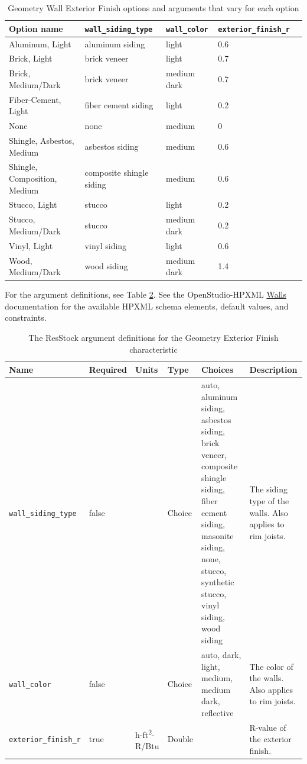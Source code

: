\begin{longtable}[]{|p{3.5cm}|p{2.5cm}|p{}|p{2.5cm}|p{2.5cm}|} \caption{Geometry Wall Exterior Finish options and arguments that vary for each option} \label{table:hc_opt_geo_wall_ext_fin} \\  

\toprule\noalign{}
Option name & \texttt{wall\_siding\_type} &
\texttt{wall\_color} & \texttt{exterior\_finish\_r} \\
\midrule\noalign{}
\endhead
\bottomrule\noalign{}
\endlastfoot
Aluminum, Light & aluminum siding & light & 0.6 \\ \hline
Brick, Light & brick veneer & light & 0.7 \\\hline
Brick, Medium/Dark & brick veneer & medium dark & 0.7 \\\hline
Fiber-Cement, Light & fiber cement siding & light & 0.2 \\\hline
None & none & medium & 0 \\\hline
Shingle, Asbestos, Medium & asbestos siding & medium & 0.6 \\\hline
Shingle, Composition, Medium & composite shingle siding & medium
& 0.6 \\\hline
Stucco, Light & stucco & light & 0.2 \\\hline
Stucco, Medium/Dark & stucco & medium dark & 0.2 \\\hline
Vinyl, Light & vinyl siding & light & 0.6 \\\hline
Wood, Medium/Dark & wood siding & medium dark & 1.4 \\
\end{longtable}

For the argument definitions, see Table \ref{table:hc_arg_def_ext_finish}. See the OpenStudio-HPXML \href{https://openstudio-hpxml.readthedocs.io/en/v1.8.1/workflow_inputs.html#hpxml-walls}{Walls} documentation for the available HPXML schema elements, default values, and constraints.

\begin{longtable}[]{|p{3.5cm}|p{1.5cm}|p{1.3cm}|p{1.1cm}|p{}|p{3.3cm}|}
\caption{The ResStock argument definitions for the Geometry Exterior Finish characteristic} \label{table:hc_arg_def_ext_finish} \\
\toprule\noalign{}
Name & Required & Units & Type & Choices & Description \\
\midrule\noalign{}
\endhead
\bottomrule\noalign{}
\endlastfoot
\texttt{wall\_siding\_type} & false & & Choice & auto, aluminum siding,
asbestos siding, brick veneer, composite shingle siding, fiber cement
siding, masonite siding, none, stucco, synthetic stucco, vinyl siding,
wood siding & The siding type of the walls. Also applies to rim joists. \\
\hline
\texttt{wall\_color} & false & & Choice & auto, dark, light, medium,
medium dark, reflective & The color of the walls. Also applies to rim
joists.  \\
\hline
\texttt{exterior\_finish\_r} & true & h-ft\textsuperscript{2}-R/Btu & Double & &
R-value of the exterior finish. \\
\end{longtable}
